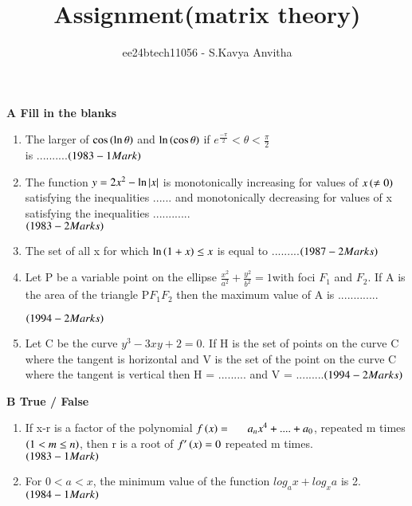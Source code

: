 \documentclass[journal,12pt,twocolumn]{IEEEtran}
\theoremstyle{remark}
\begin{document}

\vspace{3cm}

\title{Assignment(matrix theory)}
\author{ee24btech11056 - S.Kavya Anvitha}
\maketitle
\textbf{A Fill in the blanks}\\
\begin{enumerate}
	\item The larger of $\cos \left(\ln \theta\right)$ and $\ln \left(\cos \theta\right)$ if
$e^{\frac{-\pi}{2}}< \theta< \frac{\pi}{2}$\\
\indent is ..........\hfill$\left(1983 - 1 Mark\right)$\\
 \item The function $y=2x^{2}-\ln \left\vert x\right\vert$ is monotonically \indent increasing
 for values of $x\left(\neq0\right)$ satisfying the \indent inequalities ...... and
 monotonically decreasing for \indent values of x satisfying the inequalities 
 ............\\ \indent\hfill$\left(1983 - 2 Marks\right)$\\
\item The set of all x for which $\ln \left(1+x\right) \leq x$ is equal \indent
to .........\hfill$\left(1987 - 2 Marks\right)$\\
\item Let P be a variable point on the ellipse
$\displaystyle\frac{x^2}{a^2}+\displaystyle\frac{y^2}{b^2} = 1$\indent with foci 
$F_1$ and $F_2$. If A is the area of the \indent triangle 
P$F_1$$F_2$ then the maximum value of A is \hspace{5cm}\indent............. 

\hfill$\left(1994 - 2 Marks\right)$\\
\item Let C be the curve $y^3 - 3xy + 2 = 0.$ If H is the \indent set of
points on the curve C where the tangent \indent is horizontal and V is
the set of the point on the \indent curve C where the tangent is vertical
then H = \indent ......... and V = .........\hfill$\left(1994 - 2 Marks\right)$\\
\end{enumerate}
\indent\hspace{0.3cm}\textbf{B True / False}\\
\begin{enumerate}
	\item If x-r is a factor of the polynomial
		$f\brak{x} = \indent a_nx^4+....+a_0$,
repeated m times $\left(1< m\leq n\right)$, then \indent r is a root of $f'\left(x\right)=0$ 
repeated m times.\\
\indent \hfill$\left(1983 - 1 Mark\right)$\\
\item For $0 < a < x$, the minimum value of the function \indent 
$log_a x + log_x a$ is 2. \hfill$\left(1984 - 1 Mark\right)$\\
\end{enumerate}
\end{document}
